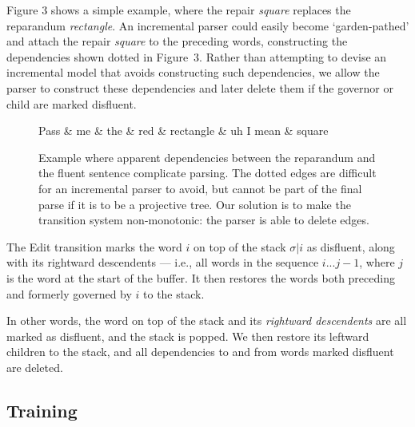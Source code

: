 \documentclass[11pt,letterpaper]{article}
\begin{document}
Figure 3 shows a simple example, where the repair {\em square} replaces the
reparandum {\em rectangle}.  An incremental parser could easily become
`garden-pathed' and attach the repair {\em square} to the preceding words,
constructing the dependencies shown dotted in Figure~3.  Rather than attempting
to devise an incremental model that avoids constructing such dependencies, we
allow the parser to construct these dependencies and later delete them if the governor
or child are marked disfluent.

\begin{figure}
    \small
\begin{dependency}[theme=simple, segmented edge]
    \begin{deptext}[column sep=.075cm, row sep=.1ex]
    Pass \& me \& the \& red \& rectangle \& uh I mean \& square \\
    \end{deptext}
    \end{dependency}
    \caption{\small Example where apparent dependencies between the reparandum and the
    fluent sentence complicate parsing.  The dotted edges are difficult for an
    incremental parser to avoid, but cannot be part of the final parse if it is to
    be a projective tree. Our solution is to make the transition system non-monotonic:
    the parser is able to delete edges.
\label{fig:rectangle}}
\end{figure}

The Edit transition marks the word $i$ on top of the stack $\sigma | i$ as
disfluent, along with its rightward descendents --- i.e., all words in the
sequence $i...j-1$, where $j$ is the word at the start of the buffer. It then
restores the words both preceding and formerly governed by $i$ to the stack.

In other words, the word on top of the stack and its \emph{rightward descendents}
are all marked as disfluent, and the stack is popped. We then restore its
leftward children to the stack, and
all dependencies to and from words marked disfluent are deleted. 

\subsection{Training}
\end{document}

